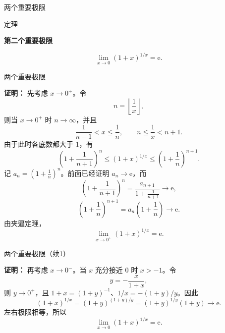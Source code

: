 \documentclass[aspectratio=169,10pt,fontset=fandol]{ctexbeamer}
\newenvironment{custom}[1]{\par\noindent\textbf{#1}\quad}{\par\vspace{0.8em}}
\newcommand{\ee}{\mathrm{e}}
\begin{document}
\begin{frame}[t,fragile]{两个重要极限}
\normalsize
\begin{block}{定理}
{\normalsize
\textbf{第二个重要极限}\par

\[
\lim_{x\to0}(1+x)^{1/x}=\ee.
\]

}
\end{block}
\end{frame}
\begin{frame}[t,fragile]{两个重要极限}
\footnotesize
{\footnotesize
\textbf{证明：}
先考虑 \(x\to0^+\)。令
\[
n=\left\lfloor\frac1x\right\rfloor,
\]
则当 \(x\to0^+\) 时 \(n\to\infty\)，并且
\[
\frac1{n+1}<x\leq\frac1n,\qquad n\leq\frac1x<n+1.
\]
由于此时各底数都大于 \(1\)，有
\[
\left(1+\frac1{n+1}\right)^n
\leq(1+x)^{1/x}
\leq\left(1+\frac1n\right)^{n+1}.
\]
记 \(a_n=(1+\frac1n)^n\)。前面已经证明 \(a_n\to\ee\)，而
\[
\left(1+\frac1{n+1}\right)^n
=\frac{a_{n+1}}{1+\frac1{n+1}}\to\ee,
\]
\[
\left(1+\frac1n\right)^{n+1}
=a_n\left(1+\frac1n\right)\to\ee.
\]
由夹逼定理，
\[
\lim_{x\to0^+}(1+x)^{1/x}=\ee.
\]


}
\end{frame}
\begin{frame}[t,fragile]{两个重要极限（续1）}
\normalsize
{\normalsize
\textbf{证明：}
再考虑 \(x\to0^-\)。当 \(x\) 充分接近 \(0\) 时 \(x>-1\)。令
\[
y=-\frac{x}{1+x},
\]
则 \(y\to0^+\)，且 \(1+x=(1+y)^{-1}\)、\(1/x=-(1+y)/y\)。因此
\[
(1+x)^{1/x}
=(1+y)^{(1+y)/y}
=(1+y)^{1/y}(1+y)\to\ee.
\]
左右极限相等，所以
\[
\lim_{x\to0}(1+x)^{1/x}=\ee.
\]

}
\end{frame}
\end{document}

